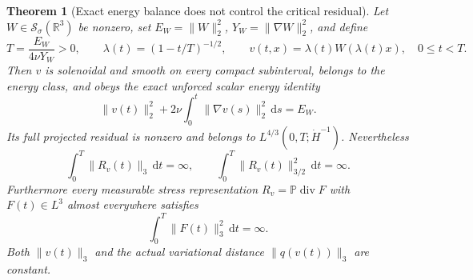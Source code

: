 \documentclass[11pt,a4paper]{article}
\newtheorem{theorem}{Theorem}[section]
\theoremstyle{definition}\newtheorem{definition}[theorem]{Definition}
\theoremstyle{remark}\newtheorem{remark}[theorem]{Remark}
\newcommand{\R}{\mathbb R}
\newcommand{\PP}{\mathbb P}
\newcommand{\dd}{\,\mathrm d}
\newcommand{\norm}[1]{\lVert #1\rVert}
\newcommand{\diver}{\operatorname{div}}
\newcommand{\Sch}{\mathcal S_\sigma(\R^3)}
\numberwithin{equation}{section}
\begin{document}
\begin{theorem}[Exact energy balance does not control the critical residual]\label{thm:concentration}
Let $W\in\Sch$ be nonzero, set $E_W=\norm W_2^2$, $Y_W=\norm{\nabla W}_2^2$, and define
\begin{equation}\label{eq:conccurve}
 T=\frac{E_W}{4\nu Y_W}>0,\qquad
 \lambda(t)=(1-t/T)^{-1/2},\qquad
 v(t,x)=\lambda(t)W(\lambda(t)x),\quad 0\le t<T.
\end{equation}
Then $v$ is solenoidal and smooth on every compact subinterval, belongs to the energy class, and obeys the exact unforced scalar energy identity
\begin{equation}\label{eq:conce}
 \norm{v(t)}_2^2+2\nu\int_0^t\norm{\nabla v(s)}_2^2\dd s=E_W.
\end{equation}
Its full projected residual is nonzero and belongs to $L^{4/3}(0,T;\dot H^{-1})$. Nevertheless
\begin{equation}\label{eq:concstrong}
 \int_0^T\norm{R_v(t)}_3\dd t=\infty,
 \qquad \int_0^T\norm{R_v(t)}_{3/2}^2\dd t=\infty.
\end{equation}
Furthermore \emph{every} measurable stress representation $R_v=\PP\diver F$ with $F(t)\in L^3$ almost everywhere satisfies
\begin{equation}\label{eq:concstress}
 \int_0^T\norm{F(t)}_3^2\dd t=\infty.
\end{equation}
Both $\norm{v(t)}_3$ and the actual variational distance $\norm{q(v(t))}_3$ are constant.
\end{theorem}
\end{document}
